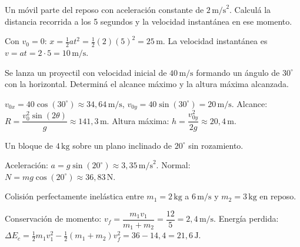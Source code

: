 \documentclass[11pt]{article}
\begin{document}
\thispagestyle{fancy}
\encabezadoExamen

\begin{pregunta}[25 puntos]
Un móvil parte del reposo con aceleración constante de $2\,\text{m/s}^2$. Calculá la distancia recorrida a los 5 segundos y la velocidad instantánea en ese momento.
\begin{resolucion}
Con $v_0 = 0$: $x = \tfrac{1}{2}at^2 = \tfrac{1}{2}(2)(5)^2 = 25\,\text{m}$. La velocidad instantánea es $v = at = 2 \cdot 5 = 10\,\text{m/s}$.
\end{resolucion}
\end{pregunta}

\begin{pregunta}[25 puntos]
Se lanza un proyectil con velocidad inicial de $40\,\text{m/s}$ formando un ángulo de $30^\circ$ con la horizontal. Determiná el alcance máximo y la altura máxima alcanzada.
\begin{resolucion}
$v_{0x} = 40\cos(30^\circ) \approx 34{,}64\,\text{m/s}$, $v_{0y} = 40\sin(30^\circ) = 20\,\text{m/s}$. Alcance: $R = \dfrac{v_0^2 \sin(2\theta)}{g} \approx 141{,}3\,\text{m}$. Altura máxima: $h = \dfrac{v_{0y}^2}{2g} \approx 20{,}4\,\text{m}$.
\end{resolucion}
\end{pregunta}

\begin{pregunta}[25 puntos]
Un bloque de $4\,\text{kg}$ sobre un plano inclinado de $20^\circ$ sin rozamiento.
\begin{resolucion}
Aceleración: $a = g\sin(20^\circ) \approx 3{,}35\,\text{m/s}^2$. Normal: $N = mg\cos(20^\circ) \approx 36{,}83\,\text{N}$.
\end{resolucion}
\end{pregunta}

\begin{pregunta}[25 puntos]
Colisión perfectamente inelástica entre $m_1=2\,\text{kg}$ a $6\,\text{m/s}$ y $m_2=3\,\text{kg}$ en reposo.
\begin{resolucion}
Conservación de momento: $v_f = \dfrac{m_1 v_1}{m_1+m_2} = \dfrac{12}{5} = 2{,}4\,\text{m/s}$. Energía perdida: $\Delta E_c = \tfrac{1}{2}m_1v_1^2 - \tfrac{1}{2}(m_1+m_2)v_f^2 = 36 - 14{,}4 = 21{,}6\,\text{J}$.
\end{resolucion}
\end{pregunta}
\end{document}
